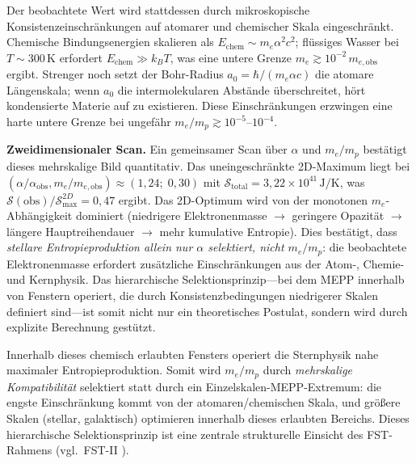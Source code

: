 \documentclass[12pt,a4paper]{article}
\theoremstyle{remark}
\begin{document}
Der beobachtete Wert wird stattdessen durch mikroskopische Konsistenzeinschr\"ankungen auf atomarer und chemischer Skala eingeschr\"ankt. Chemische Bindungsenergien skalieren als $E_{\text{chem}} \sim m_e \alpha^2 c^2$; fl\"ussiges Wasser bei $T \sim 300\,$K erfordert $E_{\text{chem}} \gg k_B T$, was eine untere Grenze $m_e \gtrsim 10^{-2}\,m_{e,\text{obs}}$ ergibt. Strenger noch setzt der Bohr-Radius $a_0 = \hbar/(m_e \alpha c)$ die atomare L\"angenskala; wenn $a_0$ die intermolekularen Abst\"ande \"uberschreitet, h\"ort kondensierte Materie auf zu existieren. Diese Einschr\"ankungen erzwingen eine harte untere Grenze bei ungef\"ahr $m_e/m_p \gtrsim 10^{-5}$--$10^{-4}$.

\textbf{Zweidimensionaler Scan.} Ein gemeinsamer Scan \"uber $\alpha$ und $m_e/m_p$ best\"atigt dieses mehrskalige Bild quantitativ. Das uneingeschr\"ankte 2D-Maximum liegt bei $(\alpha/\alpha_{\text{obs}}, m_e/m_{e,\text{obs}}) \approx (1{,}24;\; 0{,}30)$ mit $\mathcal{S}_{\text{total}} = 3{,}22 \times 10^{41}\,\text{J/K}$, was $\mathcal{S}(\text{obs})/\mathcal{S}_{\text{max}}^{2D} = 0{,}47$ ergibt. Das 2D-Optimum wird von der monotonen $m_e$-Abh\"angigkeit dominiert (niedrigere Elektronenmasse $\to$ geringere Opazit\"at $\to$ l\"angere Hauptreihendauer $\to$ mehr kumulative Entropie). Dies best\"atigt, dass \emph{stellare Entropieproduktion allein nur $\alpha$ selektiert, nicht $m_e/m_p$}: die beobachtete Elektronenmasse erfordert zus\"atzliche Einschr\"ankungen aus der Atom-, Chemie- und Kernphysik. Das hierarchische Selektionsprinzip---bei dem MEPP innerhalb von Fenstern operiert, die durch Konsistenzbedingungen niedrigerer Skalen definiert sind---ist somit nicht nur ein theoretisches Postulat, sondern wird durch explizite Berechnung gest\"utzt.

Innerhalb dieses chemisch erlaubten Fensters operiert die Sternphysik nahe maximaler Entropieproduktion. Somit wird $m_e/m_p$ durch \emph{mehrskalige Kompatibilit\"at} selektiert statt durch ein Einzelskalen-MEPP-Extremum: die engste Einschr\"ankung kommt von der atomaren/chemischen Skala, und gr\"o\ss{}ere Skalen (stellar, galaktisch) optimieren innerhalb dieses erlaubten Bereichs. Dieses hierarchische Selektionsprinzip ist eine zentrale strukturelle Einsicht des FST-Rahmens (vgl.\ FST-II \citep{FSTII}).
\end{document}
